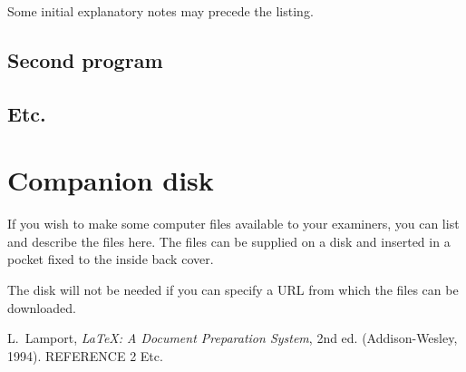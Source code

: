 \documentclass[12pt,openany,a4paper]{book}
\begin{document}
Some initial explanatory notes may precede the listing.

\section{Second program}

\section{Etc.}

\chapter{Companion disk}

If you wish to make some computer files available to your examiners,
you can list and describe the files here.  The files can be supplied
on a disk and inserted in a pocket fixed to the inside back cover.

The disk will not be needed if you can specify a URL from which the
files can be downloaded.

\cleardoublepage

\begin{thebibliography}{99}
 L.~Lamport, \emph{\LaTeX: A Document Preparation
System}, 2nd ed. (Addison-Wesley, 1994).
 REFERENCE 2
 Etc.
\end{thebibliography}
\end{document}
